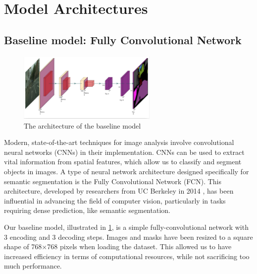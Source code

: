 \section{Model Architectures}
\subsection{Baseline model: Fully Convolutional Network }

\begin{figure}[h]
    \centering 
    \includegraphics[width=0.6\textwidth]{SimpleFCN.png}
    \caption{The architecture of the baseline model}
    \label{baseline_model}
\end{figure}

Modern, state-of-the-art techniques for image analysis involve convolutional neural networks (CNNs) in their implementation. CNNs can be used to extract vital information from spatial features, which allow us to classify and segment objects in images. A type of neural network architecture designed specifically for semantic segmentation is the Fully Convolutional Network (FCN). This architecture, developed by researchers from UC Berkeley in 2014 \cite{DBLP:journals/corr/LongSD14}, has been influential in advancing the field of computer vision, particularly in tasks requiring dense prediction, like semantic segmentation. 

Our baseline model, illustrated in \cref{baseline_model}, is a simple fully-convolutional network with 3 encoding and 3 decoding steps. Images and masks have been resized to a square shape of 768$\times$768 pixels when loading the dataset. This allowed us to have increased efficiency in terms of computational resources, while not sacrificing too much performance. 


